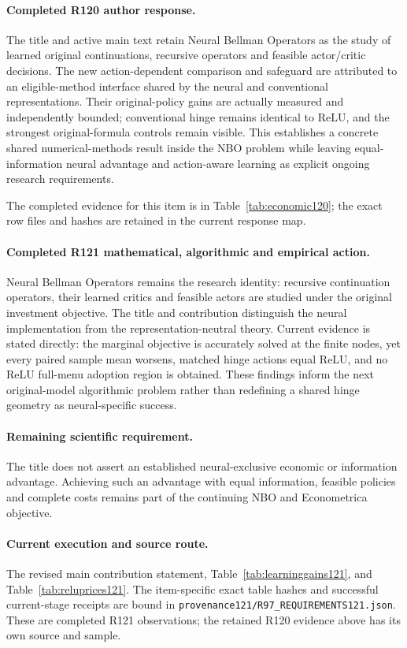 \paragraph{Completed R120 author response.}
The title and active main text retain Neural Bellman Operators as the study of learned original continuations, recursive operators and feasible actor/critic decisions. The new action-dependent comparison and safeguard are attributed to an eligible-method interface shared by the neural and conventional representations. Their original-policy gains are actually measured and independently bounded; conventional hinge remains identical to ReLU, and the strongest original-formula controls remain visible. This establishes a concrete shared numerical-methods result inside the NBO problem while leaving equal-information neural advantage and action-aware learning as explicit ongoing research requirements.

The completed evidence for this item is in Table~\ref{tab:economic120}; the exact row files and hashes are retained in the current response map.

\paragraph{Completed R121 mathematical, algorithmic and empirical action.}
Neural Bellman Operators remains the research identity: recursive continuation operators, their learned critics and feasible actors are studied under the original investment objective. The title and contribution distinguish the neural implementation from the representation-neutral theory. Current evidence is stated directly: the marginal objective is accurately solved at the finite nodes, yet every paired sample mean worsens, matched hinge actions equal ReLU, and no ReLU full-menu adoption region is obtained. These findings inform the next original-model algorithmic problem rather than redefining a shared hinge geometry as neural-specific success.

\paragraph{Remaining scientific requirement.}
The title does not assert an established neural-exclusive economic or information advantage. Achieving such an advantage with equal information, feasible policies and complete costs remains part of the continuing NBO and Econometrica objective.

\paragraph{Current execution and source route.}
The revised main contribution statement, Table~\ref{tab:learninggains121}, and Table~\ref{tab:reluprices121}.
The item-specific exact table hashes and successful current-stage receipts are bound in \nolinkurl{provenance121/R97_REQUIREMENTS121.json}. These are completed R121 observations; the retained R120 evidence above has its own source and sample.

